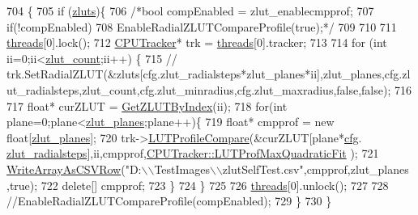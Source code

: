 \begin{DoxyCode}
704 \{
705     \textcolor{keywordflow}{if} (\hyperlink{class_queued_c_p_u_tracker_a1bad88f56b12ea8de35879acd07f4c8e}{zluts})\{
706         \textcolor{comment}{/*bool compEnabled = zlut\_enablecmpprof;}
707 \textcolor{comment}{        if(!compEnabled)}
708 \textcolor{comment}{            EnableRadialZLUTCompareProfile(true);*/}
709 
710 
711         \hyperlink{class_queued_c_p_u_tracker_a27aba85759ba549ea77db9754722e318}{threads}[0].lock();
712         \hyperlink{class_c_p_u_tracker}{CPUTracker}* trk = \hyperlink{class_queued_c_p_u_tracker_a27aba85759ba549ea77db9754722e318}{threads}[0].tracker;
713         
714         \textcolor{keywordflow}{for} (\textcolor{keywordtype}{int} ii=0;ii<\hyperlink{class_queued_c_p_u_tracker_a2848d660cb1607f7bd135fd821dd8108}{zlut\_count};ii++) \{
715             \textcolor{comment}{//
      trk.SetRadialZLUT(&zluts[cfg.zlut\_radialsteps*zlut\_planes*ii],zlut\_planes,cfg.zlut\_radialsteps,zlut\_count,cfg.zlut\_minradius,cfg.zlut\_maxradius,false,false);}
716             
717             \textcolor{keywordtype}{float}* curZLUT = \hyperlink{class_queued_c_p_u_tracker_ab467243ae4103dbf2c0b87aa6ba72b3b}{GetZLUTByIndex}(ii);          
718             \textcolor{keywordflow}{for}(\textcolor{keywordtype}{int} plane=0;plane<\hyperlink{class_queued_c_p_u_tracker_a4287f68021755bcf62e4ddf9b8b48215}{zlut\_planes};plane++)\{
719                 \textcolor{keywordtype}{float}* cmpprof = \textcolor{keyword}{new} \textcolor{keywordtype}{float}[\hyperlink{class_queued_c_p_u_tracker_a4287f68021755bcf62e4ddf9b8b48215}{zlut\_planes}];
720                 trk->\hyperlink{class_c_p_u_tracker_a605758e0bf1f897f86f38b65e99e320b}{LUTProfileCompare}(&curZLUT[plane*\hyperlink{class_queued_tracker_afb847e7f49e0af6027d58af51d5914dc}{cfg}.
      \hyperlink{struct_q_trk_computed_config_ad1a121fa7d3152df6788ff285e4d2dc6}{zlut\_radialsteps}],ii,cmpprof,\hyperlink{class_c_p_u_tracker_a196ac690351a7a8449fe21012de9efdfa699b606aff628359036eef4585adba0e}{CPUTracker::LUTProfMaxQuadraticFit}
      );
721                 \hyperlink{utils_8cpp_aa0fb8da4922e3042928ed9f6388bc09a}{WriteArrayAsCSVRow}(\textcolor{stringliteral}{"D:\(\backslash\)\(\backslash\)TestImages\(\backslash\)\(\backslash\)zlutSelfTest.csv"},cmpprof,zlut\_planes
      ,\textcolor{keyword}{true});
722                 \textcolor{keyword}{delete}[] cmpprof;
723             \}           
724         \}
725 
726         \hyperlink{class_queued_c_p_u_tracker_a27aba85759ba549ea77db9754722e318}{threads}[0].unlock();
727         
728         \textcolor{comment}{//EnableRadialZLUTCompareProfile(compEnabled);}
729     \}
730 \}
\end{DoxyCode}


